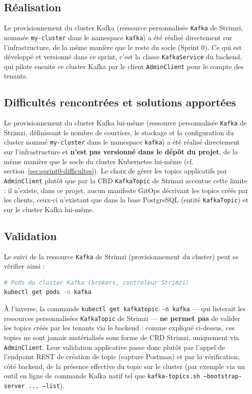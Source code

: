 \subsection{Réalisation}

Le provisionnement du cluster Kafka (ressource personnalisée \texttt{Kafka} de Strimzi, nommée \texttt{my-cluster} dans le namespace \texttt{kafka}) a été réalisé directement sur l'infrastructure, de la même manière que le reste du socle (Sprint 0). Ce qui est développé et versionné dans ce sprint, c'est la classe \texttt{KafkaService} du backend, qui pilote ensuite ce cluster Kafka par le client \texttt{AdminClient} pour le compte des tenants.

\subsection{Difficultés rencontrées et solutions apportées}
\label{sec:sprint2-difficultes}

Le provisionnement du cluster Kafka lui-même (ressource personnalisée \texttt{Kafka} de Strimzi, définissant le nombre de courtiers, le stockage et la configuration du cluster nommé \texttt{my-cluster} dans le namespace \texttt{kafka}) a été réalisé directement sur l'infrastructure et \textbf{n'est pas versionné dans le dépôt du projet}, de la même manière que le socle du cluster Kubernetes lui-même (cf. section~\ref{sec:sprint0-difficultes}). Le choix de gérer les topics applicatifs par \texttt{AdminClient} plutôt que par la CRD \texttt{KafkaTopic} de Strimzi accentue cette limite : il n'existe, dans ce projet, aucun manifeste GitOps décrivant les topics créés par les clients, ceux-ci n'existant que dans la base PostgreSQL (entité \texttt{KafkaTopic}) et sur le cluster Kafka lui-même.

\subsection{Validation}

Le suivi de la ressource \texttt{Kafka} de Strimzi (provisionnement du cluster) peut se vérifier ainsi :

\begin{lstlisting}[language=bash, caption={Commandes de validation du cluster Kafka/Strimzi (Sprint 2)}, label={lst:validation-sprint2}]
# Pods du cluster Kafka (brokers, controleur Strimzi)
kubectl get pods -n kafka
\end{lstlisting}

À l'inverse, la commande \texttt{kubectl get kafkatopic -n kafka} — qui listerait les ressources personnalisées \texttt{KafkaTopic} de Strimzi — \textbf{ne permet pas} de valider les topics créés par les tenants via le backend : comme expliqué ci-dessus, ces topics ne sont jamais matérialisés sous forme de CRD Strimzi, uniquement via \texttt{AdminClient}. Leur validation applicative passe donc plutôt par l'appel de l'endpoint REST de création de topic (capture Postman) et par la vérification, côté backend, de la présence effective du topic sur le cluster (par exemple via un outil en ligne de commande Kafka natif tel que \texttt{kafka-topics.sh --bootstrap-server ... --list}).

